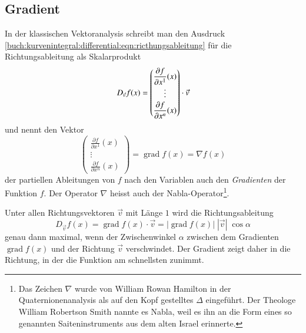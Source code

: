 \subsection{Gradient}
In der klassischen Vektoranalysis schreibt man den Ausdruck
\eqref{buch:kurvenintegral:differential:eqn:ricthungsableitung}
für die Richtungsableitung als Skalarprodukt
\[
D_{\vec{v}}f(x)
=
\renewcommand{\arraystretch}{1.5}
\begin{pmatrix}
\displaystyle
\frac{\partial f}{\partial x^1}(x)\\
\vdots\\
\displaystyle
\frac{\partial f}{\partial x^n}(x)
\end{pmatrix}
\cdot
\vec{v}
\]
und nennt den Vektor
\[
\renewcommand{\arraystretch}{1.5}
\begin{pmatrix}
\displaystyle
\frac{\partial f}{\partial x^1}(x)\\
\vdots\\
\displaystyle
\frac{\partial f}{\partial x^n}(x)
\end{pmatrix}
=
\operatorname{grad}f(x)
=
\nabla f(x)
\]
der partiellen Ableitungen von $f$ nach den
Variablen auch den {\em Gradienten}
%
der Funktion $f$.
Der Operator $\nabla$ heisst auch der Nabla-Operator\footnote{Das Zeichen
$\nabla$ wurde von William Rowan Hamilton in der Quaternionenanalysis
%
%
als auf den Kopf gestelltes $\Delta$ eingeführt.
Der Theologe William Robertson Smith nannte es Nabla, weil
%
es ihn an die Form eines so genannten Saiteninstruments aus dem
alten Israel erinnerte.}.

Unter allen Richtungsvektoren $\vec{v}$ mit Länge $1$ wird die
Richtungsableitung
\[
D_{\vec{v}}f(x)
=
\operatorname{grad}f(x)\cdot \vec{v}
=
|\operatorname{grad}f(x)|\;|\vec{v}|\;\cos\alpha
\]
genau dann maximal, wenn der Zwischenwinkel $\alpha$ zwischen
dem Gradienten $\operatorname{grad}f(x)$ und der Richtung $\vec{v}$
verschwindet.
Der Gradient zeigt daher in die Richtung, in der die Funktion am
schnellsten zunimmt.

%
%
